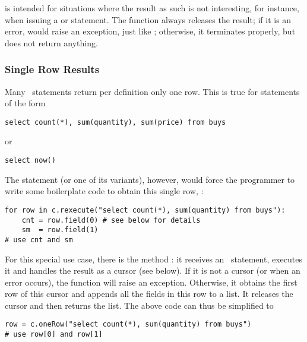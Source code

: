  is intended for situations
where the result as such is not interesting,
for instance, when issuing a  or
 statement.
The function always releases the result;
if it is an error,
 would raise an exception,
just like ;
otherwise, it terminates properly,
but does not return anything.

\subsubsection{Single Row Results}
Many \sql\ statements return per definition
only one row. This is true for statements
of the form 

\begin{sqlcode}
\begin{lstlisting}
select count(*), sum(quantity), sum(price) from buys
\end{lstlisting}
\end{sqlcode}

or

\begin{sqlcode}
\begin{lstlisting}
select now()
\end{lstlisting}
\end{sqlcode}

The  statement (or one of its variants),
however, would force the programmer to write some
boilerplate code to obtain this single row, \eg:

\begin{python}
\begin{lstlisting}
for row in c.rexecute("select count(*), sum(quantity) from buys"):
    cnt = row.field(0) # see below for details
    sm  = row.field(1)
# use cnt and sm
\end{lstlisting}
\end{python}

For this special use case, there is the method :
it receives an \sql\ statement, executes it and handles
the result as a cursor (see below). If it is not a cursor
(or when an error occurs),
the function will raise an exception.
Otherwise, it obtains the first row of this cursor
and appends all the fields in this row to a list.
It releases the cursor and then returns the list.
The above code can thus be simplified to

\begin{python}
\begin{lstlisting}
row = c.oneRow("select count(*), sum(quantity) from buys")
# use row[0] and row[1]
\end{lstlisting}
\end{python}

